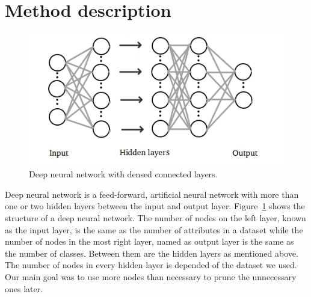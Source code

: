 \documentclass{article} %
\begin{document}

\section{Method description}
\begin{figure}[!ht]
\centering
\includegraphics[width=.75\textwidth]{globokamreza2.jpg}
\caption{Deep neural network with densed connected layers.}
\label{f:globokamreza}
\end{figure}
Deep neural network is a feed-forward, artificial neural network with more than 
one or two hidden layers between the input and output layer. 
Figure~\ref{f:globokamreza} shows the structure of a deep neural network. The 
number of nodes on the left layer, known as the input layer, is the same as the 
number of attributes in a dataset while the number of nodes in the most right 
layer, named as output layer is the same as the number of classes. Between them 
are the hidden layers as mentioned above. The number of nodes in every hidden 
layer is depended of the dataset we used. Our main goal was to use more nodes 
than necessary to prune the unnecessary ones later.
\end{document}
